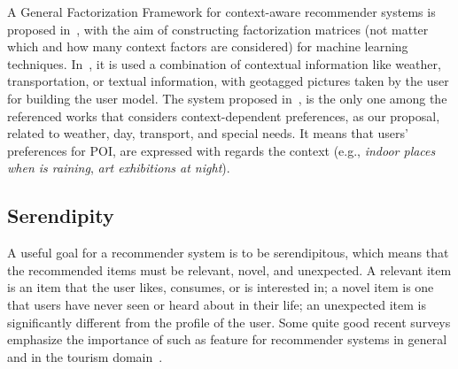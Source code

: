 A General Factorization Framework for context-aware recommender systems is proposed in~\cite{hidasi2016general}, with the aim of constructing factorization matrices (not matter which and how many context factors are considered) for machine learning techniques. In~\cite{sun2019building}, it is used a combination of contextual information like weather, transportation, or textual information, with geotagged pictures taken by the user for building the user model.
The system proposed in~\cite{alonso2012ontology}, is the only one among the referenced works that considers context-dependent   preferences, as our proposal,  related to weather, day, transport, and special needs. It means that users' preferences for POI, are expressed with regards the context (e.g., {\it indoor places when is raining}, {\it art exhibitions at night}).









\vspace{-0.2cm}
\subsection{Serendipity}

A useful goal for a recommender system is to be serendipitous, which 
means that the recommended items must be relevant, novel, and unexpected. A relevant item is an item that the user likes, consumes, or is interested in; a novel item is one
that users have never seen or heard about in their life; an unexpected item 
is 
significantly different from the profile of the user. Some quite good recent surveys emphasize the importance of such as feature for recommender systems in general~\cite{kotkov2016survey,chen2019serendipity} and in the tourism domain~\cite{tintarev2010off,menk2019recommendation}.

